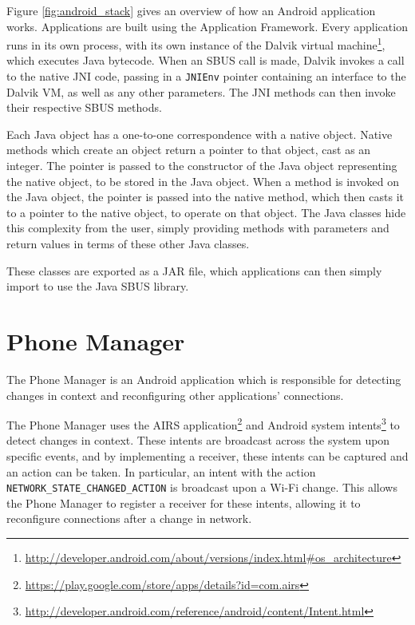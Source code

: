 \documentclass[12pt,twoside,notitlepage]{report}
\begin{document}
Figure \ref{fig:android_stack} gives an overview of how an Android application works. 
Applications are built using the Application Framework. 
Every application runs in its own process, with its own instance of the Dalvik virtual machine\footnote{\url{http://developer.android.com/about/versions/index.html\#os_architecture}}, which executes Java bytecode. 
When an SBUS call is made, Dalvik invokes a call to the native JNI code, passing in a {\tt JNIEnv} pointer containing an interface to the Dalvik VM, as well as any other parameters. 
The JNI methods can then invoke their respective SBUS methods. 

Each Java object has a one-to-one correspondence with a native object. 
Native methods which create an object return a pointer to that object, cast as an integer. 
The pointer is passed to the constructor of the Java object representing the native object, to be stored in the Java object. 
When a method is invoked on the Java object, the pointer is passed into the native method, which then casts it to a pointer to the native object, to operate on that object. 
The Java classes hide this complexity from the user, simply providing methods with parameters and return values in terms of these other Java classes.

These classes are exported as a JAR file, which applications can then simply import to use the Java SBUS library.

\section{Phone Manager}

The Phone Manager is an Android application which is responsible for detecting changes in context and reconfiguring other applications' connections. 

The Phone Manager uses the AIRS application\footnote{\url{https://play.google.com/store/apps/details?id=com.airs}} and Android system intents\footnote{\url{http://developer.android.com/reference/android/content/Intent.html}} to detect changes in context. 
These intents are broadcast across the system upon specific events, and by implementing a receiver, these intents can be captured and an action can be taken. 
In particular, an intent with the action {\tt NETWORK\_STATE\_CHANGED\_ACTION} is broadcast upon a Wi-Fi change.
This allows the Phone Manager to register a receiver for these intents, allowing it to reconfigure connections after a change in network. 
\end{document}
